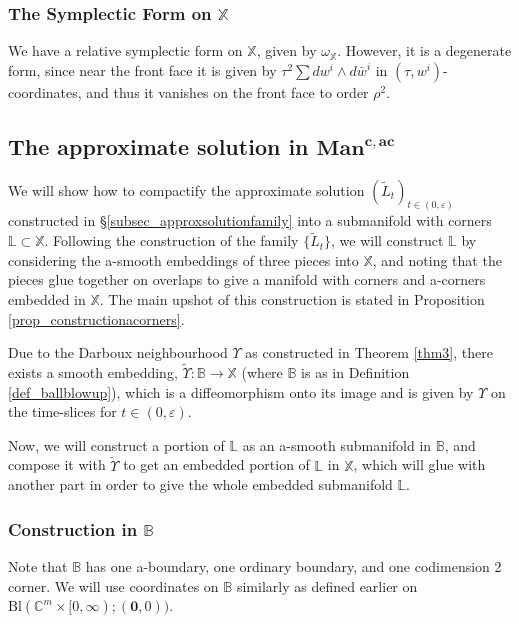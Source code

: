 \documentclass[10pt, a4paper]{article}
\theoremstyle{plain}%
\theoremstyle{definition}
\numberwithin{figure}{section}
\numberwithin{equation}{section}
\newcommand{\bL}{\mathbb{L}}
\newcommand{\bX}{\mathbb{X}}
\newcommand{\bB}{\mathbb{B}}
\newcommand{\rt}{\rightarrow}
\newcommand{\mancac}{\mathbf{Man}^{\mathbf{c,ac}}}
\newcommand{\ep}{\varepsilon}
\newcommand{\tU}{\widetilde{\Upsilon}}
\newcommand{\tL}{\widetilde{L}}
\newcommand{\Bl}{\mathrm{Bl}(\mathbb{C}^m\times[0,\infty); (\mathbf{0},0))}
\begin{document}
\subsubsection{The Symplectic Form on $\bX$}
We have a relative symplectic form on $\bX$, given by $\omega_\bX$. However, it is a degenerate form, since near the front face it is given by $\tau^2 \sum dw^i\wedge d\bar{w}^i$ in $(\tau,w^i)$-coordinates, and thus it vanishes on the front face to order $\rho^2$.



\subsection{The approximate solution in $\mancac$}\label{subsec_manac}
We will show how to compactify the approximate solution $(\tL_t)_{t\in(0,\varepsilon)}$ constructed in \S \ref{subsec_approxsolutionfamily} into a submanifold with corners $\mathbb{L}\subset\mathbb{X}$. Following the construction of the family $\{\tL_t\}$, we will construct $\mathbb{L}$ by considering the a-smooth embeddings of three pieces into $\bX$, and noting that the pieces glue together on overlaps to give a manifold with corners and a-corners embedded in $\bX$. The main upshot of this construction is stated in Proposition \ref{prop_constructionacorners}.

Due to the Darboux neighbourhood $\Upsilon$ as constructed in Theorem \ref{thm3}, there exists a smooth embedding, $\tU : \bB\rt\bX$ (where $\bB$ is as in Definition \ref{def_ballblowup}), which is a diffeomorphism onto its image and is given by $\Upsilon$ on the time-slices for $t\in(0,\ep)$.

Now, we will construct a portion of $\bL$ as an a-smooth submanifold in $\bB$, and compose it with $\tU$ to get an embedded portion of $\bL$ in $\bX$, which will glue with another part in order to give the whole embedded submanifold $\bL$.

\subsubsection{Construction in $\bB$}\label{subsubsec_cornersmooth}
Note that $\bB$ has one a-boundary, one ordinary boundary, and one codimension 2 corner. We will use coordinates on $\bB$ similarly as defined earlier on $\Bl$.
\end{document}
